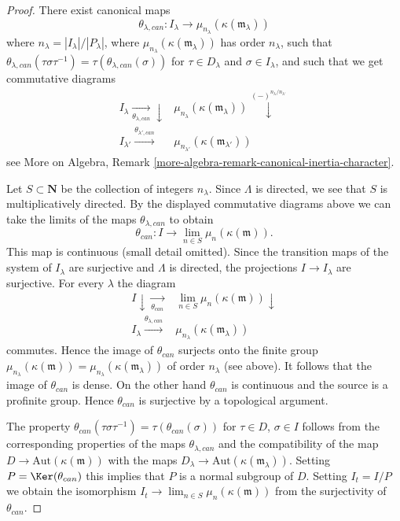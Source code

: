 \begin{proof}
\medskip\noindent
There exist canonical maps
$$
\theta_{\lambda, can} :
I_\lambda
\longrightarrow
\mu_{n_\lambda}(\kappa(\mathfrak m_\lambda))
$$
where $n_\lambda = |I_\lambda|/|P_\lambda|$, where
$\mu_{n_\lambda}(\kappa(\mathfrak m_\lambda))$ has
order $n_\lambda$, such that
$\theta_{\lambda, can}(\tau \sigma \tau^{-1}) =
\tau(\theta_{\lambda, can}(\sigma))$ for
$\tau \in D_\lambda$ and $\sigma \in I_\lambda$, and such that
we get commutative diagrams
$$
\begin{array}{cc}I_\lambda \underset{\theta_{\lambda, can}}{\longrightarrow}\downarrow & \mu_{n_\lambda}(\kappa(\mathfrak m_\lambda))
\overset{(-)^{n_\lambda/n_{\lambda'}}}{\downarrow} \\ I_{\lambda'} \overset{\theta_{\lambda', can}}{\longrightarrow} & \mu_{n_{\lambda'}}(\kappa(\mathfrak m_{\lambda'}))\end{array}
$$
see
More on Algebra, Remark \ref{more-algebra-remark-canonical-inertia-character}.

\medskip\noindent
Let $S \subset \mathbf{N}$ be the collection of integers $n_\lambda$.
Since $\Lambda$ is directed, we see that $S$ is multiplicatively directed.
By the displayed commutative diagrams above we can take the limits of
the maps $\theta_{\lambda, can}$ to obtain
$$
\theta_{can} : I \to \lim_{n \in S} \mu_n(\kappa(\mathfrak m)).
$$
This map is continuous (small detail omitted). Since the transition maps
of the system of $I_\lambda$ are surjective
and $\Lambda$ is directed, the projections $I \to I_\lambda$
are surjective. For every $\lambda$ the diagram
$$
\begin{array}{cc}I \downarrow\underset{\theta_{can}}{\longrightarrow} & \lim_{n \in S} \mu_n(\kappa(\mathfrak m)) \downarrow \\ I_{\lambda} \overset{\theta_{\lambda, can}}{\longrightarrow} & \mu_{n_\lambda}(\kappa(\mathfrak m_\lambda))\end{array}
$$
commutes. Hence the image of $\theta_{can}$ surjects onto the finite group
$\mu_{n_\lambda}(\kappa(\mathfrak m)) =
\mu_{n_\lambda}(\kappa(\mathfrak m_\lambda))$ of order $n_\lambda$
(see above). It follows that the image of $\theta_{can}$ is dense.
On the other hand $\theta_{can}$ is continuous and the
source is a profinite group. Hence $\theta_{can}$ is surjective
by a topological argument.

\medskip\noindent
The property $\theta_{can}(\tau \sigma \tau^{-1}) = \tau(\theta_{can}(\sigma))$
for $\tau \in D$, $\sigma \in I$ follows from the corresponding properties
of the maps $\theta_{\lambda, can}$ and the compatibility of the map
$D \to \text{Aut}(\kappa(\mathfrak m))$ with the maps
$D_\lambda \to \text{Aut}(\kappa(\mathfrak m_\lambda))$.
Setting $P = \Ker(\theta_{can})$ this implies
that $P$ is a normal subgroup of $D$. Setting $I_t = I/P$
we obtain the isomorphism $I_t \to \lim_{n \in S} \mu_n(\kappa(\mathfrak m))$
from the surjectivity of $\theta_{can}$.


\end{proof}
